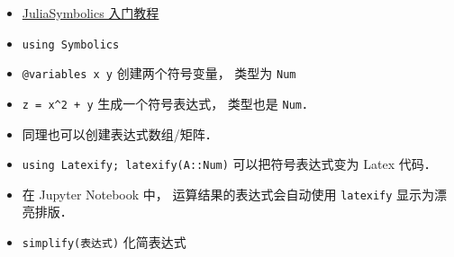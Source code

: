 
\begin{itemize}
\item \href{https://symbolics.juliasymbolics.org/dev/tutorials/symbolic_functions/}{JuliaSymbolics 入门教程}
\item \verb|using Symbolics|
\item \verb|@variables x y| 创建两个符号变量， 类型为 \verb|Num|
\item \verb|z = x^2 + y| 生成一个符号表达式， 类型也是 \verb|Num|．
\item 同理也可以创建表达式数组/矩阵．
\item \verb|using Latexify; latexify(A::Num)| 可以把符号表达式变为 Latex 代码．
\item 在 Jupyter Notebook 中， 运算结果的表达式会自动使用 \verb|latexify| 显示为漂亮排版．
\item \verb|simplify(表达式)| 化简表达式
\end{itemize}
